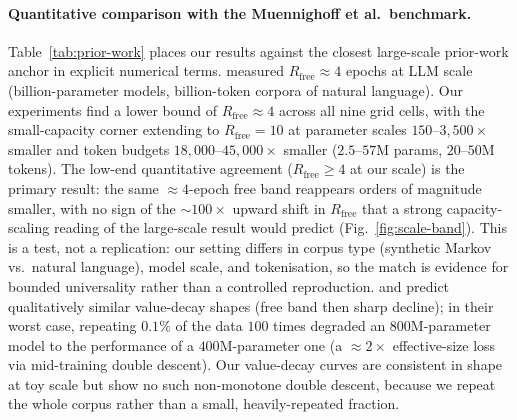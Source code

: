 \documentclass[11pt]{article}
\begin{document}
\paragraph{Quantitative comparison with the Muennighoff et al.\ benchmark.}
Table~\ref{tab:prior-work} places our results against the closest large-scale prior-work anchor
in explicit numerical terms.
\citet{muennighoff2023scaling} measured $R_{\mathrm{free}} \approx 4$ epochs at
LLM scale (billion-parameter models, billion-token corpora of natural language).
Our experiments find a lower bound of $R_{\mathrm{free}} \approx 4$ across all
nine grid cells, with the small-capacity corner extending to $R_{\mathrm{free}} = 10$
at parameter scales $150$--$3{,}500\times$ smaller and token budgets
$18{,}000$--$45{,}000\times$ smaller ($2.5$--$57$M params, $20$--$50$M tokens).
The low-end quantitative agreement ($R_{\mathrm{free}} \geq 4$ at our scale) is the
primary result: the same $\approx 4$-epoch free band reappears orders of magnitude smaller,
with no sign of the ${\sim}100\times$ upward shift in $R_{\mathrm{free}}$ that a
strong capacity-scaling reading of the large-scale result would predict
(Fig.~\ref{fig:scale-band}).
This is a test, not a replication: our setting differs in corpus type (synthetic
Markov vs.\ natural language), model scale, and tokenisation, so the match is
evidence for bounded universality rather than a controlled reproduction.
\citet{hernandez2022repeateddata} and \citet{charton2024repeated} predict qualitatively
similar value-decay shapes (free band then sharp decline); in their worst case, repeating
$0.1\%$ of the data $100$ times degraded an $800$M-parameter model to the performance of a
$400$M-parameter one (a ${\approx}2\times$ effective-size loss via mid-training double
descent). Our value-decay curves are
consistent in shape at toy scale but show no such non-monotone double descent, because we
repeat the whole corpus rather than a small, heavily-repeated fraction.
\end{document}
